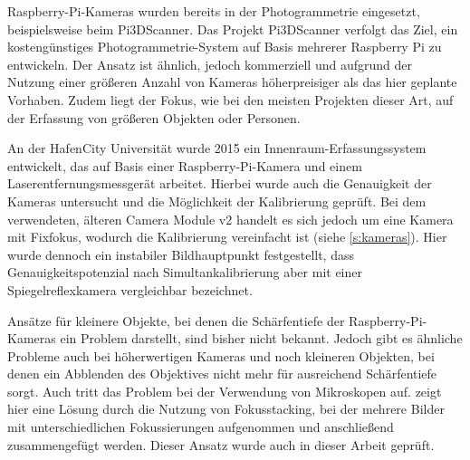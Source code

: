\documentclass[./00PhotoBox]{subfiles}
\begin{document}
Raspberry-Pi-Kameras wurden bereits in der Photogrammetrie eingesetzt, beispielsweise beim Pi3DScanner. Das Projekt Pi3DScanner verfolgt das Ziel, ein kostengünstiges Photogrammetrie-System auf Basis mehrerer Raspberry Pi zu entwickeln. Der Ansatz ist ähnlich, jedoch kommerziell und aufgrund der Nutzung einer größeren Anzahl von Kameras höherpreisiger als das hier geplante Vorhaben. Zudem liegt der Fokus, wie bei den meisten Projekten dieser Art, auf der Erfassung von größeren Objekten oder Personen.
\citep{pi3dscanner}

An der HafenCity Universität wurde 2015 ein Innenraum-Erfassungssystem entwickelt, das auf Basis einer Raspberry-Pi-Kamera und einem Laserentfernungsmessgerät arbeitet. Hierbei wurde auch die Genauigkeit der Kameras untersucht und die Möglichkeit der Kalibrierung geprüft. Bei dem verwendeten, älteren Camera Module v2 handelt es sich jedoch um eine Kamera mit Fixfokus, wodurch die Kalibrierung vereinfacht ist (siehe \autoref{s:kameras}). Hier wurde dennoch ein instabiler Bildhauptpunkt festgestellt, dass Genauigkeitspotenzial nach Simultankalibrierung aber mit einer Spiegelreflexkamera vergleichbar bezeichnet.
\citep{3d_raspi_laserscanner}

Ansätze für kleinere Objekte, bei denen die Schärfentiefe der Raspberry-Pi-Kameras ein Problem darstellt, sind bisher nicht bekannt. Jedoch gibt es ähnliche Probleme auch bei höherwertigen Kameras und noch kleineren Objekten, bei denen ein Abblenden des Objektives nicht mehr für ausreichend Schärfentiefe sorgt. Auch tritt das Problem bei der Verwendung von Mikroskopen auf. \cite{focusstack_sfm} zeigt hier eine Lösung durch die Nutzung von Fokusstacking, bei der mehrere Bilder mit unterschiedlichen Fokussierungen aufgenommen und anschließend zusammengefügt werden. Dieser Ansatz wurde auch in dieser Arbeit geprüft.




\biblio
\end{document}
